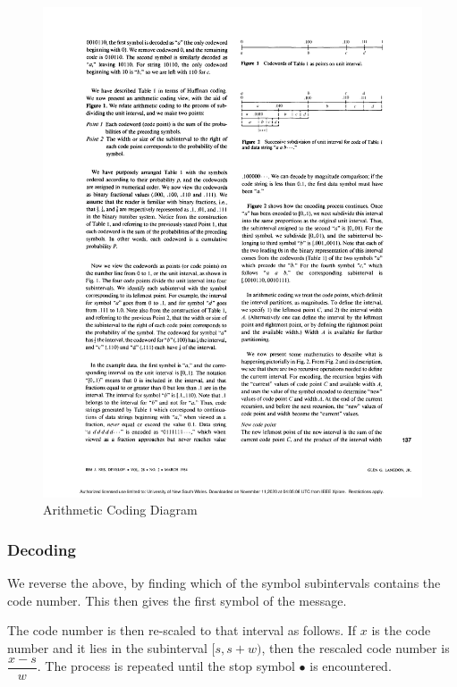 \documentclass{article}
\begin{document}
\begin{figure}[htbp]
    \center
    \includegraphics[scale=1.35]{img/C3_figure_2}
    \caption{Arithmetic Coding Diagram \cite{Langdon_1984}}
\end{figure}

\subsubsection{Decoding}

We reverse the above, by finding which of the symbol subintervals contains
the code number. This then gives the first symbol of the message.

The code number is then re-scaled to that interval as follows.
If $x$ is the code number and it lies in the subinterval $[s, s+w)$,
then the rescaled code number is $\dfrac{x-s}{w}$. The process is repeated until
the stop symbol $\bullet$ is encountered.
\end{document}
